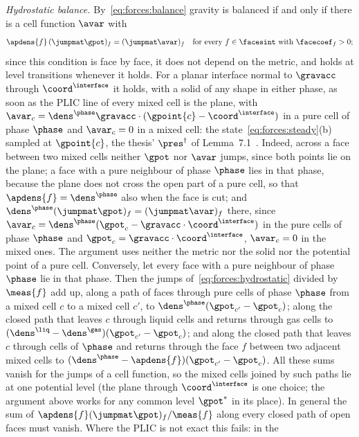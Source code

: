 \emph{Hydrostatic balance.} By~\cref{eq:forces:balance} gravity is balanced
if and only if there is a cell function $\avar$ with
\begin{equation}\label{eq:forces:hydrostatic}
  \apdens{f}\,(\jumpmat\gpot)_f=(\jumpmat\avar)_f\quad\text{for every }f\in\facesint\text{ with }\facecoef_f>0 ;
\end{equation}
since this condition is face by face, it does not depend on the metric, and
holds at level transitions whenever it holds. For a planar interface normal
to $\gravacc$ through $\coord^{\interface}$ it holds, with a solid of any
shape in either phase, as soon as the PLIC line of every mixed cell is the
plane, with $\avar_c=\dens^{\phase}\gravacc\cdot(\gpoint{c}-\coord^{\interface})$
in a pure cell of phase $\phase$ and $\avar_c=0$ in a mixed cell: the
state~\cref{eq:forces:steady}(b) sampled at $\gpoint{c}$, the thesis'
$\pres^{\dagger}$ of Lemma~7.1~. Indeed, across
a face between two mixed cells neither $\gpot$ nor $\avar$ jumps, since both
points lie on the plane; a face with a pure neighbour of phase $\phase$ lies
in that phase, because the plane does not cross the open part of a pure
cell, so that $\apdens{f}=\dens^{\phase}$ also when the face is cut; and
$\dens^{\phase}(\jumpmat\gpot)_f=(\jumpmat\avar)_f$ there, since
$\avar_c=\dens^{\phase}(\gpot_c-\gravacc\cdot\coord^{\interface})$ in the pure
cells of phase $\phase$ and $\gpot_c=\gravacc\cdot\coord^{\interface}$,
$\avar_c=0$ in the mixed ones. The argument uses neither the metric nor the
solid nor the potential point of a pure cell. Conversely, let every face
with a pure neighbour of phase $\phase$ lie in that phase. Then the jumps
of~\cref{eq:forces:hydrostatic} divided by $\meas{f}$ add up, along a path of
faces through pure cells of phase $\phase$ from a mixed cell $c$ to a mixed
cell $c'$, to $\dens^{\phase}(\gpot_{c'}-\gpot_c)$; along the closed path that
leaves $c$ through liquid cells and returns through gas cells to
$(\dens^{\liq}-\dens^{\gas})(\gpot_{c'}-\gpot_c)$; and along the closed path
that leaves $c$ through cells of $\phase$ and returns through the face $f$
between two adjacent mixed cells to
$(\dens^{\phase}-\apdens{f})(\gpot_{c'}-\gpot_c)$. All these sums vanish for
the jumps of a cell function, so the mixed cells joined by such paths lie at
one potential level (the plane through $\coord^{\interface}$ is one choice;
the argument above works for any common level $\gpot^{*}$ in its place). In
general the sum of $\apdens{f}(\jumpmat\gpot)_f/\meas{f}$ along every closed
path of open faces must vanish. Where the PLIC is not exact this fails: in the

